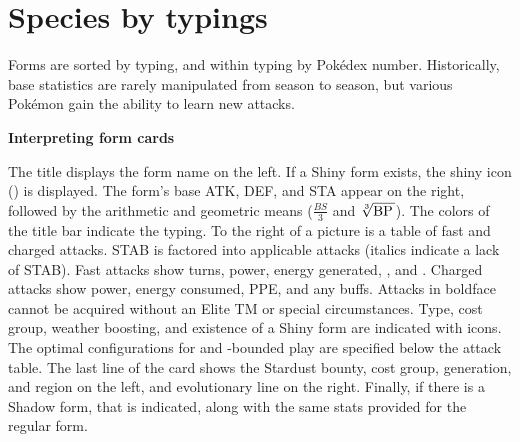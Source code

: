 \chapter{Species by typings\label{chap:speciesbytype}}
Forms are sorted by typing, and within typing by Pokédex number.
Historically, base statistics are rarely manipulated from season to season, but
 various Pokémon gain the ability to learn new attacks.
\vfill
\begin{center}\textbf{Interpreting form cards}\end{center}

The title displays the form name on the left.
If a Shiny form exists, the shiny icon () is displayed.
The form's base ATK, DEF, and STA appear on the right, followed by the arithmetic and geometric means
 ($\frac{BS}{3}$ and $\sqrt[3]{\mbox{BP}\,}$).
The colors of the title bar indicate the typing.
To the right of a picture is a table of fast and charged attacks.
STAB is factored into applicable attacks (italics indicate a lack of STAB).
Fast attacks show turns, power, energy generated, \PPT{}, and \EPT{}\@.
Charged attacks show power, energy consumed, PPE, and any buffs.
Attacks in boldface cannot be acquired without an Elite TM or special circumstances.
Type, cost group, weather boosting, and existence of a Shiny form are indicated with icons.
The optimal configurations for  and -bounded play are specified below the attack table.
The last line of the card shows the Stardust bounty, cost group, generation, and region on the left,
 and evolutionary line on the right.
Finally, if there is a Shadow form, that is indicated, along with the same stats
  provided for the regular form.
\vfill
